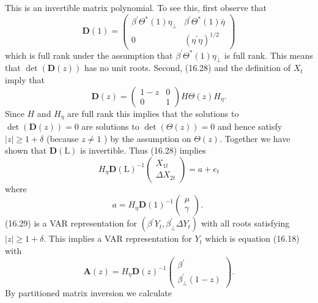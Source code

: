 \documentclass[10pt]{article}
\begin{document}
This is an invertible matrix polynomial. To see this, first observe that
$$
\boldsymbol{D}(1)=\left(\begin{array}{cc}
\beta^{\prime} \Theta^{*}(1) \eta_{\perp} & \beta^{\prime} \Theta^{*}(1) \bar{\eta} \\
0 & \left(\eta^{\prime} \eta\right)^{1 / 2}
\end{array}\right)
$$
which is full rank under the assumption that $\beta^{\prime} \Theta^{*}(1) \eta_{\perp}$ is full rank. This means that $\operatorname{det}(\boldsymbol{D}(z))$ has no unit roots. Second, (16.28) and the definition of $X_{t}$ imply that
$$
\boldsymbol{D}(z)=\left(\begin{array}{cc}
1-z & 0 \\
0 & 1
\end{array}\right) H \Theta(z) H_{\eta} .
$$
Since $H$ and $H_{\eta}$ are full rank this implies that the solutions to $\operatorname{det}(\boldsymbol{D}(z))=0$ are solutions to $\operatorname{det}(\Theta(z))=0$ and hence satisfy $|z| \geq 1+\delta$ (because $z \neq 1$ ) by the assumption on $\Theta(z)$. Together we have shown that $\boldsymbol{D}(\mathrm{L})$ is invertible. Thus (16.28) implies
$$
H_{\eta} \boldsymbol{D}(\mathrm{L})^{-1}\left(\begin{array}{c}
X_{1 t} \\
\Delta X_{2 t}
\end{array}\right)=a+e_{t}
$$
where
$$
a=H_{\eta} \boldsymbol{D}(1)^{-1}\left(\begin{array}{l}
\mu \\
\gamma
\end{array}\right) \text {. }
$$
(16.29) is a VAR representation for $\left(\beta^{\prime} Y_{t}, \beta_{\perp}^{\prime} \Delta Y_{t}\right)$ with all roots satisfying $|z| \geq 1+\delta$. This implies a VAR representation for $Y_{t}$ which is equation (16.18) with
$$
\boldsymbol{A}(z)=H_{\eta} \boldsymbol{D}(z)^{-1}\left(\begin{array}{c}
\beta^{\prime} \\
\beta_{\perp}^{\prime}(1-z)
\end{array}\right) .
$$
By partitioned matrix inversion we calculate
\end{document}
